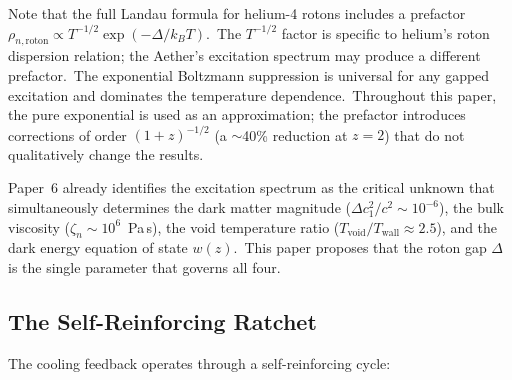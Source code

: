 \documentclass[12pt,letterpaper]{article}
\begin{document}
Note that the full Landau formula for helium-4 rotons includes a prefactor
$\rho_{n,\mathrm{roton}} \propto T^{-1/2}\exp(-\Delta/k_B T)$.\ The
$T^{-1/2}$ factor is specific to helium's roton dispersion relation; the
Aether's excitation spectrum may produce a different prefactor.\ The
exponential Boltzmann suppression is universal for any gapped excitation and
dominates the temperature dependence.\ Throughout this paper, the pure
exponential is used as an approximation; the prefactor introduces corrections
of order $(1+z)^{-1/2}$ (a $\sim$40\% reduction at $z = 2$) that do not
qualitatively change the results.

Paper~6 already identifies the excitation spectrum as the critical unknown that
simultaneously determines the dark matter magnitude ($\Delta c_1^2/c^2 \sim
10^{-6}$), the bulk viscosity ($\zeta_n \sim 10^6$~Pa\,s), the void temperature
ratio ($T_{\mathrm{void}}/T_{\mathrm{wall}} \approx 2.5$), and the dark energy
equation of state $w(z)$.\ This paper proposes that the roton gap $\Delta$ is the
single parameter that governs all four.


\subsection{The Self-Reinforcing Ratchet}

The cooling feedback operates through a self-reinforcing cycle:
\end{document}
